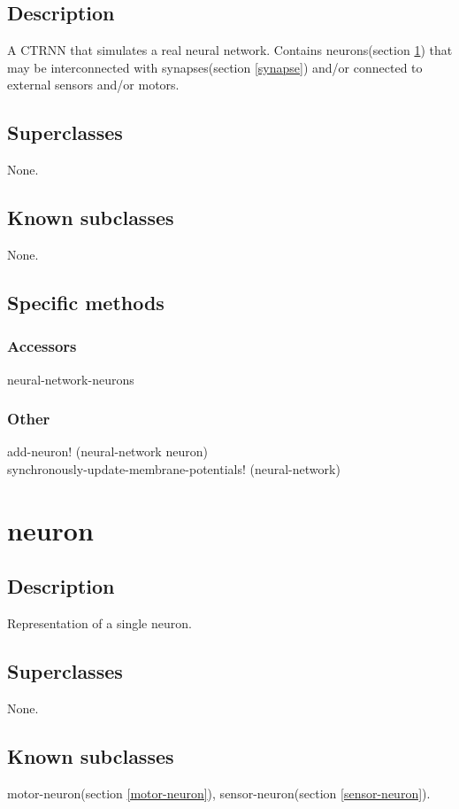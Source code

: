 \documentclass[english]{article}
\begin{document}
\subsection{Description}
A \ac{CTRNN} that simulates a real neural network. Contains neurons(section \ref{neuron}) that may be interconnected with synapses(section \ref{synapse}) and/or connected to external sensors and/or motors.

\subsection{Superclasses}
None.

\subsection{Known subclasses}
None.

\subsection{Specific methods}

\subsubsection{Accessors}
neural-network-neurons\\

\subsubsection{Other}
add-neuron! (neural-network neuron)\\
synchronously-update-membrane-potentials! (neural-network)\\


\newpage
\section{neuron}
\label{neuron}

\subsection{Description}
Representation of a single neuron.

\subsection{Superclasses}
None.

\subsection{Known subclasses}
motor-neuron(section \ref{motor-neuron}), sensor-neuron(section \ref{sensor-neuron}).
\end{document}

